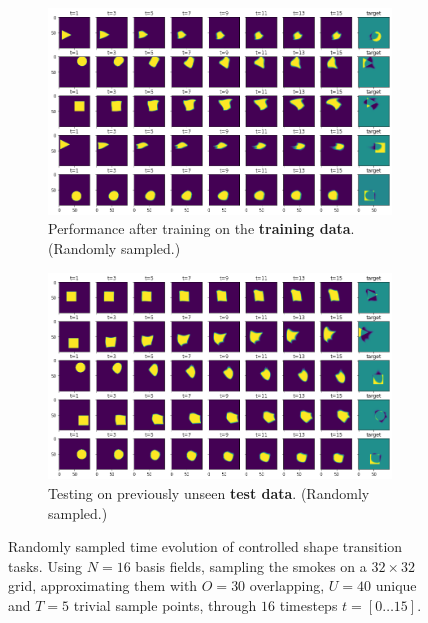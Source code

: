 \begin{figure}
  \centering
  \begin{subfigure}{\textwidth}
    \centering
    \includegraphics[width=\textwidth]{figures/nn-final/trained_trajectories_horizontal.png}
    \caption{Performance after training on the \textbf{training data}. (Randomly
    sampled.)}
    \label{fig:NN-shape-transition-train}
  \end{subfigure}
  \begin{subfigure}{\textwidth}
    \centering
    \includegraphics[width=\textwidth]{figures/nn-final/test_trajectories_horizontal.png}
    \caption{Testing on previously unseen \textbf{test data}. (Randomly
      sampled.)}
    \label{fig:NN-shape-transition-test}
  \end{subfigure}
  \caption{Randomly sampled time evolution of controlled shape transition
  tasks. Using $N=16$ basis fields, sampling the smokes on a $32\times 32$ grid,
  approximating them with $O=30$ overlapping, $U=40$ unique and $T=5$ trivial
  sample points, through $16$ timesteps $t=[0\dots15]$.}
  \label{fig:NN-shape-transition}
\end{figure}

